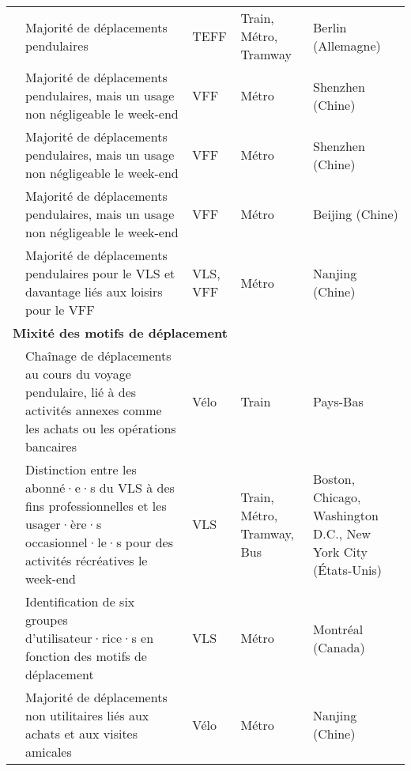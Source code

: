\begin{longtable}{p{3cm}p{4cm}p{1.5cm}p{1.8cm}p{2.3cm}}
    \small{\textcite{heumann_spatiotemporal_2021}}\index{Heumann, Maximilian|pagebf} & \small{Majorité de déplacements pendulaires} & \small{TEFF} & \small{Train, Métro, Tramway} & \small{Berlin (Allemagne)}\\
    \small{\textcite{wang_relationship_2020}}\index{Wang, Ruoyu|pagebf} & \small{Majorité de déplacements pendulaires, mais un usage non négligeable le week-end} & \small{VFF} & \small{Métro} & \small{Shenzhen (Chine)}\\
    \small{\textcite{wu_identification_2023}}\index{Wu, Hao|pagebf}\index{Wu, Hao|pagebf} & \small{Majorité de déplacements pendulaires, mais un usage non négligeable le week-end} & \small{VFF} & \small{Métro} & \small{Shenzhen (Chine)}\\
    \small{\textcite{li_unbalanced_2022}}\index{Li, Lili|pagebf} & \small{Majorité de déplacements pendulaires, mais un usage non négligeable le week-end} & \small{VFF} & \small{Métro} & \small{Beijing (Chine)}\\
    \small{\textcite{chen_what_2022}}\index{Chen, Wendong|pagebf} & \small{Majorité de déplacements pendulaires pour le VLS et davantage liés aux loisirs pour le VFF} & \small{VLS, VFF} & \small{Métro} & \small{Nanjing (Chine)}\\
    \hline
\multicolumn{5}{l}{\textbf{Mixité des motifs de déplacement}}\\
    \small{\textcite{jonkeren_bicycle_2021}}\index{Jonkeren, Olaf|pagebf} & \small{Chaînage de déplacements au cours du voyage pendulaire, lié à des activités annexes comme les achats ou les opérations bancaires} & \small{Vélo} & \small{Train} & \small{Pays-Bas}\\
    \small{\textcite{kong_deciphering_2020}}\index{Kong, Hui|pagebf} & \small{Distinction entre les abonné·e·s du VLS à des fins professionnelles et les usager·ère·s occasionnel·le·s pour des activités récréatives le week-end} & \small{VLS} & \small{Train, Métro, Tramway, Bus} & \small{Boston, Chicago, Washington D.C., New York City (États-Unis)}\\
    \small{\textcite{tarpin-pitre_typology_2020}}\index{Tarpin-Pitre, Léandre|pagebf} & \small{Identification de six groupes d'utilisateur·rice·s en fonction des motifs de déplacement} & \small{VLS} & \small{Métro} & \small{Montréal (Canada)}\\
    \small{\textcite{chen_determinants_2012}}\index{Chen, Lijun|pagebf} & \small{Majorité de déplacements non utilitaires liés aux achats et aux visites amicales} & \small{Vélo} & \small{Métro} & \small{Nanjing (Chine)}\\

\end{longtable}
